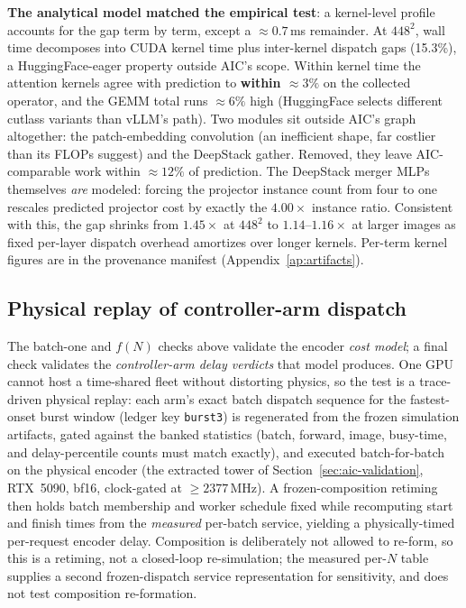 \textbf{The analytical model matched the empirical test}: a kernel-level
profile accounts for the gap term by term, except a ${\approx}0.7$\,ms
remainder. At $448^2$, wall time decomposes into CUDA kernel time plus
inter-kernel dispatch gaps (15.3\%), a HuggingFace-eager property outside
AIC's scope. Within kernel time the attention kernels agree with prediction
to \textbf{within ${\approx}3\%$} on the collected operator, and the GEMM
total runs ${\approx}6\%$ high (HuggingFace selects different cutlass
variants than vLLM's path). Two modules sit outside AIC's graph altogether:
the patch-embedding convolution (an inefficient shape, far costlier than
its FLOPs suggest) and the DeepStack gather. Removed, they leave
AIC-comparable work within ${\approx}12\%$ of prediction. The DeepStack
merger MLPs themselves \emph{are} modeled: forcing the projector instance
count from four to one rescales predicted projector cost by exactly the
$4.00\times$ instance ratio. Consistent with this, the gap shrinks from $1.45\times$ at $448^2$ to
$1.14$--$1.16\times$ at larger images as fixed per-layer dispatch overhead
amortizes over longer kernels. Per-term kernel figures are in the provenance
manifest (Appendix~\ref{ap:artifacts}).

\subsection{Physical replay of controller-arm dispatch}
\label{sec:aic-physical-replay}

The batch-one and $f(N)$ checks above validate the encoder \emph{cost
model}; a final check validates the \emph{controller-arm delay verdicts}
that model produces. One GPU cannot host a time-shared fleet without
distorting physics, so the test is a trace-driven physical replay: each
arm's exact batch dispatch sequence for the fastest-onset burst window
(ledger key \texttt{burst3}) is regenerated from the frozen simulation
artifacts, gated against the banked statistics (batch, forward, image,
busy-time, and delay-percentile counts must match exactly), and executed
batch-for-batch on the physical encoder (the extracted tower of
Section~\ref{sec:aic-validation}, RTX~5090, bf16, clock-gated at
${\geq}2377$\,\si{\mega\hertz}). A frozen-composition retiming then holds
batch membership and worker schedule fixed while recomputing start and
finish times from the \emph{measured} per-batch service, yielding a
physically-timed per-request encoder delay. Composition is deliberately not
allowed to re-form, so this is a retiming, not a closed-loop
re-simulation; the measured per-$N$ table supplies a second
frozen-dispatch service representation for sensitivity, and does not test
composition re-formation.

